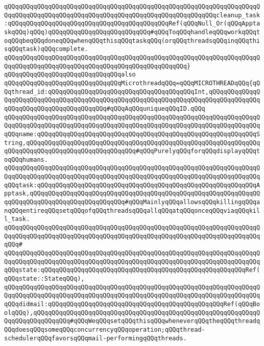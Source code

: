 \newline
\verb|qQQqqQQqqQQqqQQqqQQqqQQqqQQqqQQqqQQqqQQqqQQqqQQqqQQqqQQqqQQqqQQqqQQqqQQqqQQqqQQqqQQqqQQqqQQqqQQqqQQqqQQqqQQqqQQqqQQqqQQqqQQqqQQqcleanup_task:qQQqqQQqqQQqqQQqqQQqqQQqqQQqqQQqqQQqqQQqqQQqRef(qQQqNull_Or(qQQqApptaskqQQq)qQQq)qQQqqQQqqQQqqQQqqQQqqQQqqQQq#qQQqToqQQqhandleqQQqworkqQQqtoqQQqbeqQQqdoneqQQqwhenqQQqthisqQQqtaskqQQq(orqQQqthreadsqQQqinqQQqthisqQQqtask)qQQqcomplete.|\newline
\verb|qQQqqQQqqQQqqQQqqQQqqQQqqQQqqQQqqQQqqQQqqQQqqQQqqQQqqQQqqQQqqQQqqQQqqQQqqQQqqQQqqQQqqQQqqQQqqQQqqQQqqQQqqQQqqQQqqQQqqQQq}|\newline
\newline
\verb|qQQqqQQqqQQqqQQqqQQqqQQqqQQqqQQqalso|\newline
\verb|qQQqqQQqqQQqqQQqqQQqqQQqqQQqqQQqMicrothreadqQQq=qQQqMICROTHREADqQQq{qQQqthread_id:qQQqqQQqqQQqqQQqqQQqqQQqqQQqqQQqqQQqqQQqInt,qQQqqQQqqQQqqQQqqQQqqQQqqQQqqQQqqQQqqQQqqQQqqQQqqQQqqQQqqQQqqQQqqQQqqQQqqQQqqQQqqQQqqQQqqQQqqQQqqQQqqQQqqQQqqQQq#qQQqAqQQquniqueqQQqID.qQQq|\newline
\verb|qQQqqQQqqQQqqQQqqQQqqQQqqQQqqQQqqQQqqQQqqQQqqQQqqQQqqQQqqQQqqQQqqQQqqQQqqQQqqQQqqQQqqQQqqQQqqQQqqQQqqQQqqQQqqQQqqQQqqQQqqQQqqQQqqQQqqQQqqQQqqQQqname:qQQqqQQqqQQqqQQqqQQqqQQqqQQqqQQqqQQqqQQqqQQqqQQqqQQqqQQqqQQqString,qQQqqQQqqQQqqQQqqQQqqQQqqQQqqQQqqQQqqQQqqQQqqQQqqQQqqQQqqQQqqQQqqQQqqQQqqQQqqQQqqQQqqQQqqQQqqQQqqQQq#qQQqPurelyqQQqforqQQqdisplayqQQqtoqQQqhumans.|\newline
\verb|qQQqqQQqqQQqqQQqqQQqqQQqqQQqqQQqqQQqqQQqqQQqqQQqqQQqqQQqqQQqqQQqqQQqqQQqqQQqqQQqqQQqqQQqqQQqqQQqqQQqqQQqqQQqqQQqqQQqqQQqqQQqqQQqqQQqqQQqqQQqqQQqtask:qQQqqQQqqQQqqQQqqQQqqQQqqQQqqQQqqQQqqQQqqQQqqQQqqQQqqQQqqQQqApptask,qQQqqQQqqQQqqQQqqQQqqQQqqQQqqQQqqQQqqQQqqQQqqQQqqQQqqQQqqQQqqQQqqQQqqQQqqQQqqQQqqQQqqQQqqQQqqQQq#qQQqMainlyqQQqallowsqQQqkillingqQQqanqQQqentireqQQqsetqQQqofqQQqthreadsqQQqallqQQqatqQQqonceqQQqviaqQQqkill_task.|\newline
\verb|qQQqqQQqqQQqqQQqqQQqqQQqqQQqqQQqqQQqqQQqqQQqqQQqqQQqqQQqqQQqqQQqqQQqqQQqqQQqqQQqqQQqqQQqqQQqqQQqqQQqqQQqqQQqqQQqqQQqqQQqqQQqqQQqqQQqqQQqqQQqqQQq#|\newline
\verb|qQQqqQQqqQQqqQQqqQQqqQQqqQQqqQQqqQQqqQQqqQQqqQQqqQQqqQQqqQQqqQQqqQQqqQQqqQQqqQQqqQQqqQQqqQQqqQQqqQQqqQQqqQQqqQQqqQQqqQQqqQQqqQQqqQQqqQQqqQQqqQQqstate:qQQqqQQqqQQqqQQqqQQqqQQqqQQqqQQqqQQqqQQqqQQqqQQqqQQqqQQqRef(qQQqstate::StateqQQq),|\newline
\verb|qQQqqQQqqQQqqQQqqQQqqQQqqQQqqQQqqQQqqQQqqQQqqQQqqQQqqQQqqQQqqQQqqQQqqQQqqQQqqQQqqQQqqQQqqQQqqQQqqQQqqQQqqQQqqQQqqQQqqQQqqQQqqQQqqQQqqQQqqQQqqQQqdidmail:qQQqqQQqqQQqqQQqqQQqqQQqqQQqqQQqqQQqqQQqqQQqqQQqRef(qQQqBoolqQQq),qQQqqQQqqQQqqQQqqQQqqQQqqQQqqQQqqQQqqQQqqQQqqQQqqQQqqQQqqQQqqQQqqQQqqQQqqQQqqQQq#qQQqWeqQQqsetqQQqthisqQQqwheneverqQQqtheqQQqthreadqQQqdoesqQQqsomeqQQqconcurrencyqQQqoperation;qQQqthread-schedulerqQQqfavorsqQQqmail-performingqQQqthreads.|\newline
